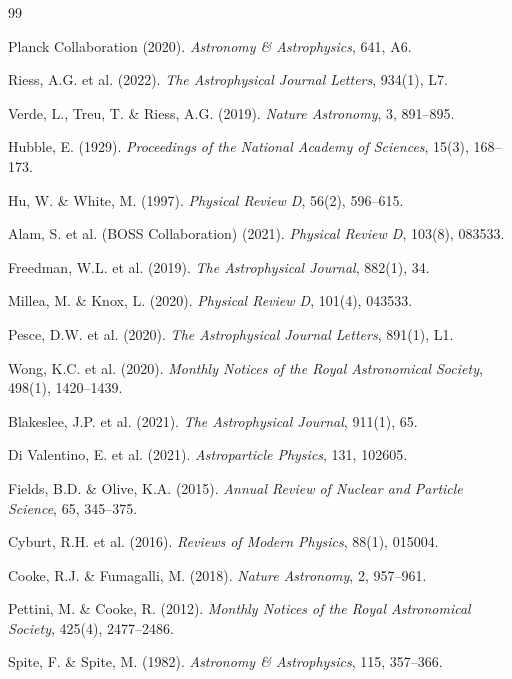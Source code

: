 \documentclass[12pt,a4paper]{book}
\theoremstyle{definition}
\theoremstyle{remark}
\begin{document}
\backmatter

\begin{thebibliography}{99}

 Planck Collaboration (2020). \textit{Astronomy \& Astrophysics}, 641, A6.

 Riess, A.G. et al. (2022). \textit{The Astrophysical Journal Letters}, 934(1), L7.

 Verde, L., Treu, T. \& Riess, A.G. (2019). \textit{Nature Astronomy}, 3, 891--895.

 Hubble, E. (1929). \textit{Proceedings of the National Academy of Sciences}, 15(3), 168--173.

 Hu, W. \& White, M. (1997). \textit{Physical Review D}, 56(2), 596--615.

 Alam, S. et al. (BOSS Collaboration) (2021). \textit{Physical Review D}, 103(8), 083533.

 Freedman, W.L. et al. (2019). \textit{The Astrophysical Journal}, 882(1), 34.

 Millea, M. \& Knox, L. (2020). \textit{Physical Review D}, 101(4), 043533.

 Pesce, D.W. et al. (2020). \textit{The Astrophysical Journal Letters}, 891(1), L1.

 Wong, K.C. et al. (2020). \textit{Monthly Notices of the Royal Astronomical Society}, 498(1), 1420--1439.

 Blakeslee, J.P. et al. (2021). \textit{The Astrophysical Journal}, 911(1), 65.

 Di Valentino, E. et al. (2021). \textit{Astroparticle Physics}, 131, 102605.

 Fields, B.D. \& Olive, K.A. (2015). \textit{Annual Review of Nuclear and Particle Science}, 65, 345--375.

 Cyburt, R.H. et al. (2016). \textit{Reviews of Modern Physics}, 88(1), 015004.

 Cooke, R.J. \& Fumagalli, M. (2018). \textit{Nature Astronomy}, 2, 957--961.

 Pettini, M. \& Cooke, R. (2012). \textit{Monthly Notices of the Royal Astronomical Society}, 425(4), 2477--2486.

 Spite, F. \& Spite, M. (1982). \textit{Astronomy \& Astrophysics}, 115, 357--366.


\end{thebibliography}
\end{document}
